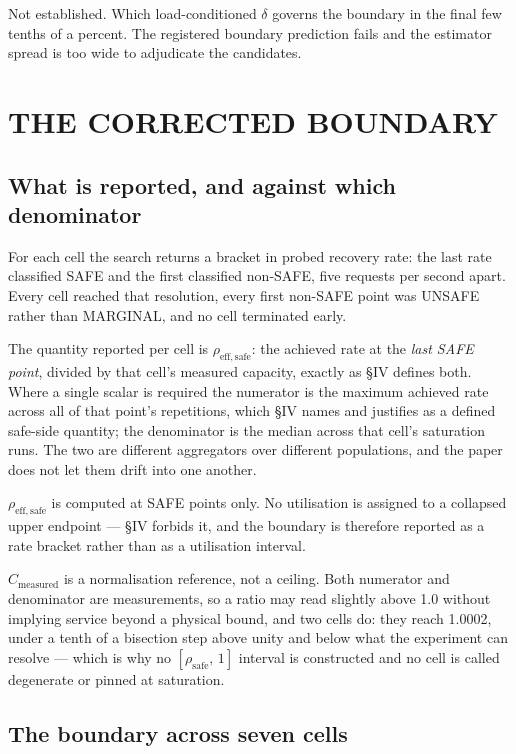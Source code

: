 \documentclass{ieeeaccess}
\begin{document}
Not established. Which load-conditioned $\delta$ governs the boundary in the final few tenths of a percent. The registered boundary prediction fails and the estimator spread is too wide to adjudicate the candidates.

\section{THE CORRECTED BOUNDARY}

\subsection{What is reported, and against which denominator}

For each cell the search returns a bracket in probed recovery rate: the last rate classified SAFE and the first classified non-SAFE, five requests per second apart. Every cell reached that resolution, every first non-SAFE point was UNSAFE rather than MARGINAL, and no cell terminated early.

The quantity reported per cell is $\rho_{\mathrm{eff,safe}}$: the achieved rate at the \textit{last SAFE point}, divided by that cell's measured capacity, exactly as \S{}IV defines both. Where a single scalar is required the numerator is the maximum achieved rate across all of that point's repetitions, which \S{}IV names and justifies as a defined safe-side quantity; the denominator is the median across that cell's saturation runs. The two are different aggregators over different populations, and the paper does not let them drift into one another.

$\rho_{\mathrm{eff,safe}}$ is computed at SAFE points only. No utilisation is assigned to a collapsed upper endpoint --- \S{}IV forbids it, and the boundary is therefore reported as a rate bracket rather than as a utilisation interval.

$C_{\mathrm{measured}}$ is a normalisation reference, not a ceiling. Both numerator and denominator are measurements, so a ratio may read slightly above 1.0 without implying service beyond a physical bound, and two cells do: they reach 1.0002, under a tenth of a bisection step above unity and below what the experiment can resolve --- which is why no $[\rho_{\mathrm{safe}},\, 1]$ interval is constructed and no cell is called degenerate or pinned at saturation.

\subsection{The boundary across seven cells}
\end{document}
